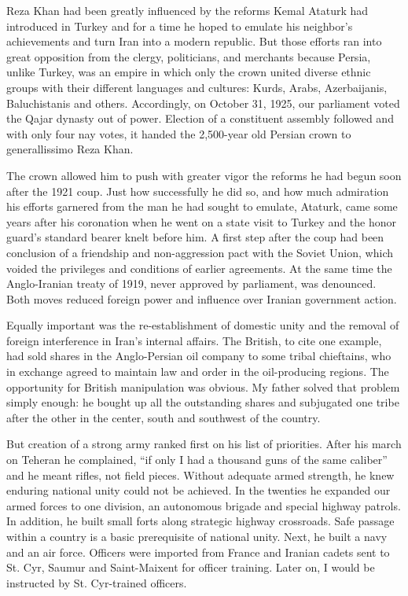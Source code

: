 Reza Khan had been greatly influenced by the reforms Kemal Ataturk had introduced in Turkey and for a time he hoped to emulate his neighbor's achievements and turn Iran into a modern republic. But those efforts ran into great opposition from the clergy, politicians, and merchants because Persia, unlike Turkey, was an empire in which only the crown united diverse ethnic groups with their different languages and cultures: Kurds, Arabs, Azerbaijanis, Baluchistanis and others. Accordingly, on October 31, 1925, our parliament voted the Qajar dynasty out of power. Election of a constituent assembly followed and with only four nay votes, it handed the 2,500-year old Persian crown to generallissimo Reza Khan. 

The crown allowed him to push with greater vigor the reforms he had begun soon after the 1921 coup. Just how successfully he did so, and how much admiration his efforts garnered from the man he had sought to emulate, Ataturk, came some years after his coronation when he went on a state visit to Turkey and the honor guard's standard bearer knelt before him. A first step after the coup had been conclusion of a friendship and non-aggression pact with the Soviet Union, which voided the privileges and conditions of earlier agreements. At the same time the Anglo-Iranian treaty of 1919, never approved by parliament, was denounced. Both moves reduced foreign power and influence over Iranian government action. 

Equally important was the re-establishment of domestic unity and the removal of foreign interference in Iran's internal affairs. The British, to cite one example, had sold shares in the Anglo-Persian oil company to some tribal chieftains, who in exchange agreed to maintain law and order in the oil-producing regions. The opportunity for British manipulation was obvious. My father solved that problem simply enough: he bought up all the outstanding shares and subjugated one tribe after the other in the center, south and southwest of the country. 

But creation of a strong army ranked first on his list of priorities. After his march on Teheran he complained, “if only I had a thousand guns of the same caliber” and he meant rifles, not field pieces. Without adequate armed strength, he knew enduring national unity could not be achieved. In the twenties he expanded our armed forces to one division, an autonomous brigade and special highway patrols. In addition, he built small forts along strategic highway crossroads. Safe passage within a country is a basic prerequisite of national unity. Next, he built a navy and an air force. Officers were imported from France and Iranian cadets sent to St. Cyr, Saumur and Saint-Maixent for officer training. Later on, I would be instructed by St. Cyr-trained officers. 

